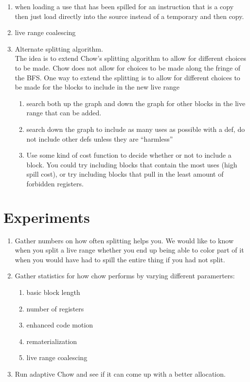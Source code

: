 \documentclass[11pt]{article}
\begin{document}
\begin{enumerate}
\item when loading a use that has been spilled for an instruction
that is a copy then just load directly into the source instead of a
temporary and then copy.

\item live range coalescing

\item Alternate splitting algorithm. \\
The idea is to extend Chow's splitting algorithm to allow for
different choices to be made. Chow does not allow for choices to be
made along the fringe of the BFS. One way to extend the splitting is
to allow for different choices to be made for the blocks to include in
the new live range
  \begin{enumerate}
  \item search both up the graph and down the graph for other blocks
  in the live range that can be added.
  \item search down the graph to include as many uses as possible with
  a def, do not include other defs unless they are ``harmless''
  \item Use some kind of cost function to decide whether or not to
  include a block. You could try including blocks that contain the
  most uses (high spill cost), or try including blocks that pull in
  the least amount of forbidden registers.
  \end{enumerate}
\end{enumerate}

\section{Experiments}
\begin{enumerate}
\item Gather numbers on how often splitting helps you. We would like to
know when you split a live range whether you end up being able to
color part of it when you would have had to spill the entire thing if
you had not split.

\item Gather statistics for how chow performs by varying different
paramerters:
\begin{enumerate}
\item basic block length
\item number of registers
\item enhanced code motion
\item rematerialization
\item live range coalescing
\end{enumerate}

\item Run adaptive Chow and see if it can come up with a better
allocation.

\end{enumerate}
\end{document}
